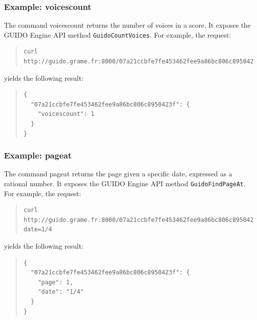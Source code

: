 \documentclass{article}
\begin{document}
\subsubsection{Example: voicescount}
The command voicescount returns the number of voices in a score.  It exposes the GUIDO Engine API method \verb=GuidoCountVoices=.  For example, the request:
\begin{quote}
\begingroup
\fontsize{7.5pt}{12pt}\selectfont
\begin{verbatim}
curl http://guido.grame.fr:8000/07a21ccbfe7fe453462fee9a86bc806c8950423f/voicescount
\end{verbatim}
\endgroup
\end{quote}
yields the following result:
\begin{quote}
\begin{verbatim}
{
  "07a21ccbfe7fe453462fee9a86bc806c8950423f": {
    "voicescount": 1
  }
}
\end{verbatim}
\end{quote}


\subsubsection{Example: pageat}
The command pageat returns the page given a specific date, expressed as a rational number.  It exposes the GUIDO Engine API method \verb=GuidoFindPageAt=.  For example, the request:
\begin{quote}
\begingroup
\fontsize{7.5pt}{12pt}\selectfont
\begin{verbatim}
curl http://guido.grame.fr:8000/07a21ccbfe7fe453462fee9a86bc806c8950423f/pageat?date=1/4
\end{verbatim}
\endgroup
\end{quote}
yields the following result:
\begin{quote}
\begin{verbatim}
{
  "07a21ccbfe7fe453462fee9a86bc806c8950423f": {
    "page": 1,
    "date": "1/4"
  }
}
\end{verbatim}
\end{quote}
\end{document}
